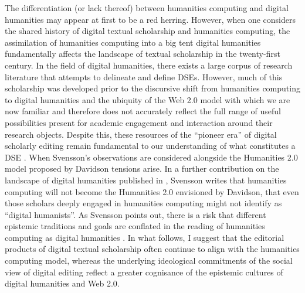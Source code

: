 \begin{paper}
The differentiation (or lack thereof) between humanities computing and digital humanities may appear at first to be a red herring. However, when one considers the shared history of digital textual scholarship and humanities computing, the assimilation of humanities computing into a big tent digital humanities fundamentally affects the landscape of textual scholarship in the twenty-first century. In the field of digital humanities, there exists a large corpus of research literature that attempts to delineate and define DSEs. However, much of this scholarship was developed prior to the discursive shift from humanities computing to digital humanities and the ubiquity of the Web 2.0 model with which we are now familiar and therefore does not accurately reflect the full range of useful possibilities present for academic engagement and interaction around their research objects. Despite this, these resources of the ``pioneer era'' of digital scholarly editing remain fundamental to our understanding of what constitutes a DSE \citep{robinson_current_2005}. When Svensson's observations are considered alongside the Humanities 2.0 model proposed by Davidson tensions arise. In a further contribution on the landscape of digital humanities published in \citeyear{svensson_landscape_2010}, Svensson writes that humanities computing will not become the Humanities 2.0 envisioned by Davidson, that even those scholars deeply engaged in humanities computing might not identify as ``digital humanists''. As Svensson points out, there is a risk that different epistemic traditions and goals are conflated in the reading of humanities computing as digital humanities \citep{svensson_landscape_2010}. In what follows, I suggest that the editorial products of digital textual scholarship often continue to align with the humanities computing model, whereas the underlying ideological commitments of the social view of digital editing reflect a greater cognisance of the epistemic cultures of digital humanities and Web 2.0.


\end{paper}

